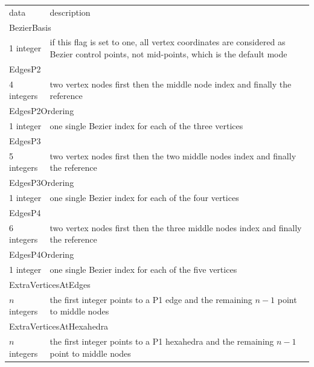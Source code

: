 \documentclass[a4paper,12pt]{article}
\begin{document}
\setlongtables
\begin{longtable}{|m{4cm}|m{11cm}|}
\endhead
\endfoot

\hline
\multicolumn{2}{|l|}{keyword} \\
\hline
data & description \\
\hline\hline

\multicolumn{2}{|l|}{BezierBasis} \\
\hline
1 integer & if this flag is set to one, all vertex coordinates are considered as Bezier control points, not mid-points, which is the default mode \\
\hline\hline

\multicolumn{2}{|l|}{EdgesP2} \\
\hline
4 integers & two vertex nodes first then the middle node index and finally the reference \\
\hline\hline

\multicolumn{2}{|l|}{EdgesP2Ordering} \\
\hline
1 integer & one single Bezier index for each of the three vertices \\
\hline\hline

\multicolumn{2}{|l|}{EdgesP3} \\
\hline
5 integers & two vertex nodes first then the two middle nodes index and finally the reference \\
\hline\hline

\multicolumn{2}{|l|}{EdgesP3Ordering} \\
\hline
1 integer & one single Bezier index for each of the four vertices \\
\hline\hline

\multicolumn{2}{|l|}{EdgesP4} \\
\hline
6 integers & two vertex nodes first then the three middle nodes index and finally the reference \\
\hline\hline

\multicolumn{2}{|l|}{EdgesP4Ordering} \\
\hline
1 integer & one single Bezier index for each of the five vertices \\
\hline\hline

\multicolumn{2}{|l|}{ExtraVerticesAtEdges} \\
\hline
$n$ integers & the first integer points to a P1 edge and the remaining $n-1$ point to middle nodes \\
\hline\hline

\multicolumn{2}{|l|}{ExtraVerticesAtHexahedra} \\
\hline
$n$ integers & the first integer points to a P1 hexahedra and the remaining $n-1$ point to middle nodes \\
\hline\hline


\end{longtable}
\end{document}
